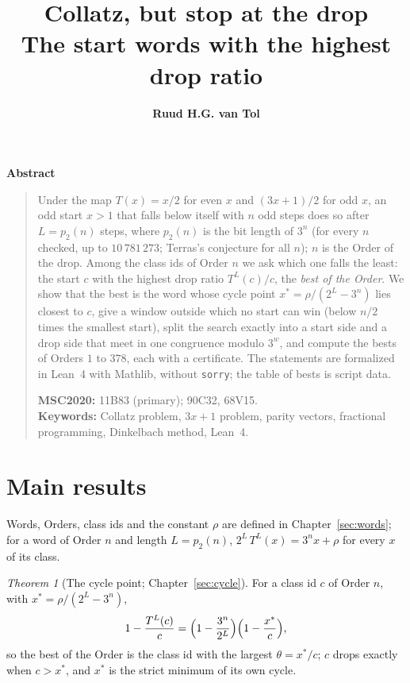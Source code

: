 \documentclass[10pt,a4paper,titlepage]{article}
\title{\textbf{Collatz, but stop at the drop}\\[0.5ex]
  \Large The start words with the highest drop ratio}
\author{\textbf{Ruud H.G. van Tol}}
\date{\begin{tikzpicture}\dropturnfig\end{tikzpicture}\\[5ex]
  \textbf{Draft (46)}\\[8ex]  %
  {\small\copyright\ 2026 Ruud H.G. van Tol. Licensed under \href{https://creativecommons.org/licenses/by/4.0/}{CC BY 4.0}.}
}
\theoremstyle{plain}
\theoremstyle{definition}
\theoremstyle{remark}
\newtheorem{mainthm}{Theorem}
\begin{document}
\maketitle

\begin{center}\textbf{Abstract}\end{center}
\begin{quotation}\small\noindent
Under the map $T(x) = x/2$ for even $x$ and $(3x+1)/2$ for odd $x$, an odd start $x > 1$ that
falls below itself with $n$ odd steps does so after $L = p_2(n)$ steps, where $p_2(n)$ is the bit
length of $3^n$ (for every $n$ checked, up to $10\,781\,273$; Terras's conjecture for all $n$); $n$ is the Order of the drop. Among the class ids of Order $n$ we ask which one
falls the least: the start $c$ with the highest drop ratio $T^L(c)/c$, the \emph{best of the Order}.
We show that the best is the word whose cycle point $x^\ast = \rho/(2^L - 3^n)$ lies
closest to $c$, give a window outside which no start can win (below $n/2$ times the smallest start), split the search exactly into a
start side and a drop side that meet in one congruence modulo $3^w$, and compute the bests of
Orders $1$ to $378$, each with a certificate. The statements are formalized in Lean~4 with
Mathlib, without \texttt{sorry}; the table of bests is script data.

\medskip\noindent\textbf{MSC2020:} 11B83 (primary); 90C32, 68V15.\\
\textbf{Keywords:} Collatz problem, $3x+1$ problem, parity vectors, fractional programming,
Dinkelbach method, Lean~4.
\end{quotation}

\begingroup\let\clearpage\relax\section*{Main results}\endgroup
{}

Words, Orders, class ids and the constant $\rho$ are defined in Chapter~\ref{sec:words}; for a word
of Order $n$ and length $L = p_2(n)$, $2^L\,T^L(x) = 3^n x + \rho$ for every $x$ of its class.

\begin{mainthm}[The cycle point; Chapter~\ref{sec:cycle}]
For a class id $c$ of Order $n$, with $x^\ast = \rho/(2^L - 3^n)$,
\[
1 - \frac{T^L(c)}{c} = \Bigl(1 - \frac{3^n}{2^L}\Bigr)\Bigl(1 - \frac{x^\ast}{c}\Bigr),
\]
so the best of the Order is the class id with the largest $\theta = x^\ast/c$; $c$ drops exactly when
$c > x^\ast$, and $x^\ast$ is the strict minimum of its own cycle.
\end{mainthm}
\end{document}

